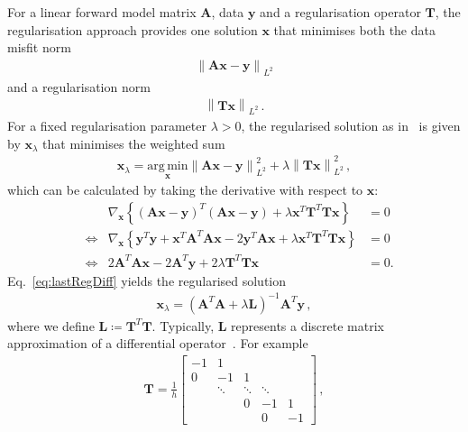 For a linear forward model matrix $\bm{A}$, data $\bm{y}$ and a regularisation operator $\bm{T}$, the regularisation approach provides one solution $\bm{x}$ that minimises both the data misfit norm
\begin{align}
	\left\lVert  \bm{A} \bm{x}- \bm{y} \right\rVert_{L^2}
\end{align} and a regularisation norm 
\begin{align}
	\left\lVert \bm{T} \bm{x} \right\rVert_{L^2} \, . \label{semiNorm}
\end{align}
For a fixed regularisation parameter $\lambda> 0 $, the regularised solution as in~\cite{hansen2010discrete, fox2016fast, tan2016LecNot} is given by $\bm{x}_{\lambda}$ that minimises the weighted sum
\begin{align}
	\bm{x}_{\lambda} = \underset{\bm{x}}{\mathrm{arg\,min}} \left\lVert  \bm{A} \bm{x} -\bm{y} \right\rVert_{L^2}^2 + \lambda \left\lVert \bm{T} \bm{x} \right\rVert_{L^2}^2\, ,
\end{align}
which can be calculated by taking the derivative with respect to $\bm{x}$:
\begin{align}
	& & \nabla_{\bm{x}} \left\{ ( \bm{A} \bm{x}-\bm{y})^T ( \bm{A} \bm{x}-\bm{y}) + \lambda \bm{x}^T \bm{T}^T \bm{T} \bm{x} \right\} &= 0 \\
	&\iff & \nabla_{\bm{x}} \left\{ \bm{y}^T \bm{y} + \bm{x}^T \bm{A}^T \bm{A} \bm{x} - 2 \bm{y}^T \bm{A} \bm{x} + \lambda \bm{x}^T \bm{T}^T \bm{T} \bm{x} \right\} &= 0 \\
	&\iff & 2 \bm{A}^T \bm{A} \bm{x} - 2 \bm{A}^T \bm{y} + 2 \lambda \bm{T}^T \bm{T} \bm{x} &= 0 \label{eq:lastRegDiff}.
\end{align}
Eq.~\ref{eq:lastRegDiff} yields the regularised solution
\begin{align}
	\bm{x}_{\lambda} = (\bm{A}^T \bm{A} + \lambda \bm{L})^{-1} \bm{A}^T \bm{y} \, , \label{eq:regSol}
\end{align}
where we define $\bm{L} \coloneqq \bm{T}^T \bm{T}$.
Typically, $\bm{L} $ represents a discrete matrix approximation of a differential operator~\cite{tan2016LecNot}.
For example
\begin{align}
	\bm{T} = \frac{1}{h}
	\begin{bmatrix}
		-1 & 1 & & &  \\
		0 & -1 & 1 & &   \\
		& \ddots & \ddots & \ddots &\\ 
		& & 0 & -1 & 1  \\
		& & & 0 & -1 
	\end{bmatrix} \, ,
\end{align}
